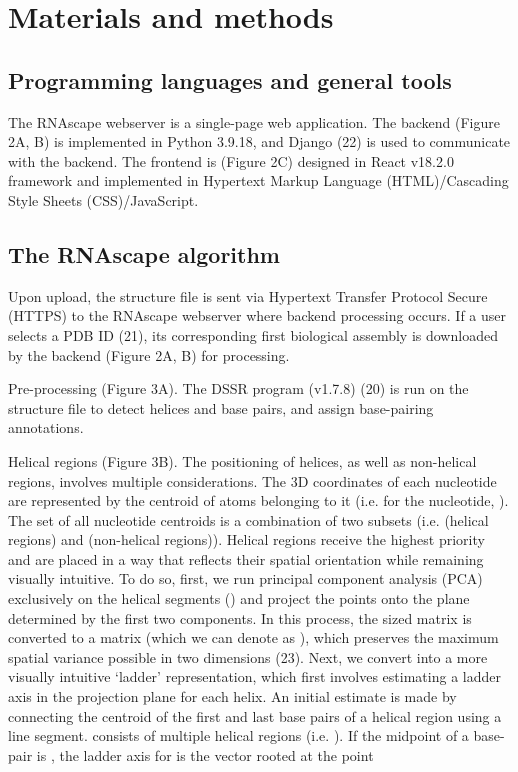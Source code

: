 \section{Materials and methods} 

\subsection{Programming languages and general tools}

The RNAscape webserver is a single-page web application. The backend (Figure 2A, B) is implemented in Python 3.9.18, and Django (22) is used to communicate with the backend. The frontend is (Figure 2C) designed in React v18.2.0 framework and implemented in Hypertext Markup Language (HTML)/Cascading Style Sheets (CSS)/JavaScript.

\subsection{The RNAscape algorithm}

Upon upload, the structure file is sent via Hypertext Transfer Protocol Secure (HTTPS) to the RNAscape webserver where backend processing occurs. If a user selects a PDB ID (21), its corresponding first biological assembly is downloaded by the backend (Figure 2A, B) for processing.

Pre-processing (Figure 3A). The DSSR program (v1.7.8) (20) is run on the structure file to detect helices and base pairs, and assign base-pairing annotations.

Helical regions (Figure 3B). The positioning of helices, as well as non-helical regions, involves multiple considerations. The 3D coordinates of each nucleotide are represented by the centroid of atoms belonging to it (i.e. for the nucleotide,
). The set of all nucleotide centroids is a combination of two subsets (i.e. (helical regions) and (non-helical regions)). Helical regions receive the highest priority and are placed in a way that reflects their spatial orientation while remaining visually intuitive. To do so, first, we run principal component analysis (PCA) exclusively on the helical segments () and project the points onto the plane determined by the first two components. In this process, the  sized matrix is converted to a matrix (which we can denote as ), which preserves the maximum spatial variance possible in two dimensions (23). Next, we convert into a more visually intuitive ‘ladder’ representation, which first involves estimating a ladder axis in the projection plane for each helix. An initial estimate is made by connecting the centroid of the first and last base pairs of a helical region using a line segment. consists of multiple helical regions (i.e. ). If the midpoint of a base-pair is
, the ladder axis for is the vector
rooted at the point

